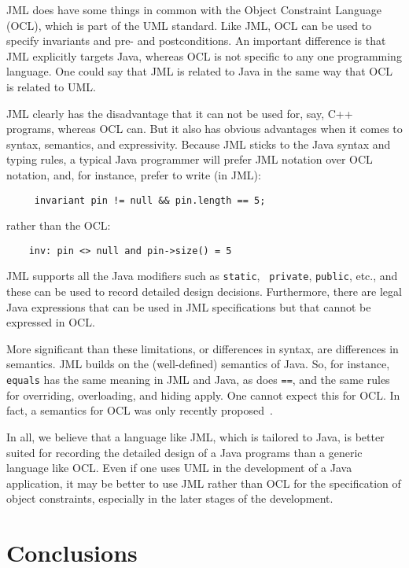 \documentclass{entcs}
\begin{document}
JML does have some things in common with the Object Constraint
Language (OCL), which is part of the UML standard.  Like JML, OCL can
be used to specify invariants and pre- and postconditions.  An
important difference is that JML explicitly targets Java, whereas OCL
is not specific to any one programming language.  One could say that
JML is related to Java in the same way that OCL is related to UML\@.

JML clearly has the disadvantage that it can not be used for, say, C++
programs, whereas OCL can.  But it also has obvious advantages when it
comes to syntax, semantics, and expressivity.  Because JML sticks to
the Java syntax and typing rules, a typical Java programmer will
prefer JML notation over OCL notation, and, for instance, prefer to
write (in JML):
\begin{verbatim}
     invariant pin != null && pin.length == 5;
\end{verbatim}
rather than the OCL:
\begin{verbatim}
    inv: pin <> null and pin->size() = 5
\end{verbatim}
JML supports all the Java modifiers such as {\tt static}, {\tt
  private}, {\tt public}, etc., and these can be used to record
detailed design decisions.  Furthermore, there are legal Java
expressions that can be used in JML specifications but that cannot be
expressed in OCL\@.

More significant than these limitations, or differences in syntax, are
differences in semantics.  JML builds on the (well-defined) semantics
of Java. So, for instance, {\tt equals} has the same meaning in JML
and Java, as does {\tt ==}, and the same rules for overriding,
overloading, and hiding apply.  One cannot expect this for OCL\@.  In
fact, a semantics for OCL was only recently
proposed~\cite{brucker.ea:proposal:2002}.

In all, we believe that a language like JML, which is tailored to
Java, is better suited for recording the detailed design of a Java
programs than a generic language like OCL\@.  Even if one uses UML in
the development of a Java application, it may be better to use JML
rather than OCL for the specification of object constraints,
especially in the later stages of the development.

\section{Conclusions}
\label{conclusions}
\end{document}
